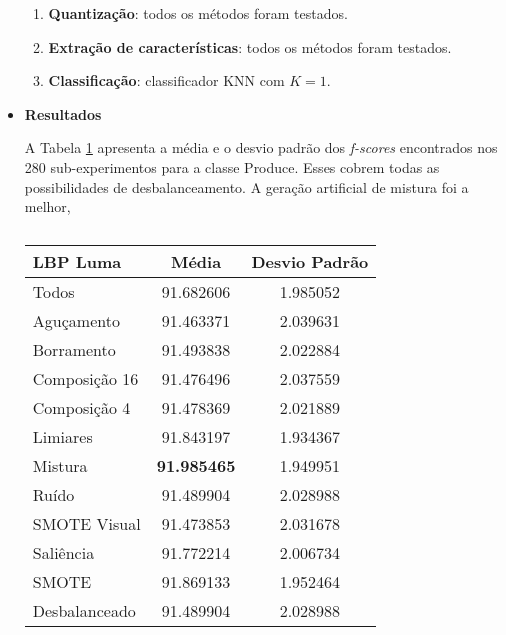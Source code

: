 \begin{itemize}
\begin{enumerate}
\item \textbf{Quantização}: todos os métodos foram testados.
\item \textbf{Extração de características}: todos os métodos foram testados.
\item \textbf{Classificação}: classificador KNN com $K=1$.
\end{enumerate}

\item[] \textbf{Resultados}

A Tabela \ref{tab:resultados:3.3} apresenta a média e o desvio padrão dos \textit{f-scores} encontrados nos 280 sub-experimentos para a classe Produce. Esses cobrem todas as possibilidades de desbalanceamento. A geração artificial de mistura foi a melhor,

\begin{minipage}{\linewidth}
\begin{table}[H]
\begin{center}
\caption{}
\label{tab:resultados:3.3}
\begin{tabular}{|l|c|c|}
\hline
\textbf{LBP Luma} & \textbf{Média}     & \textbf{Desvio Padrão} \\ \hline
   Todos        &  91.682606 &  1.985052  \\ \hline
  Aguçamento    &  91.463371 &  2.039631  \\ \hline
  Borramento    &  91.493838 &  2.022884  \\ \hline
  Composição 16 &  91.476496 &  2.037559  \\ \hline
  Composição 4  &  91.478369 &  2.021889  \\ \hline
  Limiares      &  91.843197 &  1.934367  \\ \hline
  Mistura       &  \textbf{91.985465} &  1.949951  \\ \hline
  Ruído         &  91.489904 &  2.028988  \\ \hline
  SMOTE Visual  &  91.473853 &  2.031678  \\ \hline
  Saliência     &  91.772214 &  2.006734  \\ \hline
 SMOTE          &  91.869133 &  1.952464  \\ \hline
Desbalanceado   &  91.489904 &  2.028988  \\ \hline
\end{tabular}
\end{center}
\end{table}
\end{minipage}


\end{itemize}
